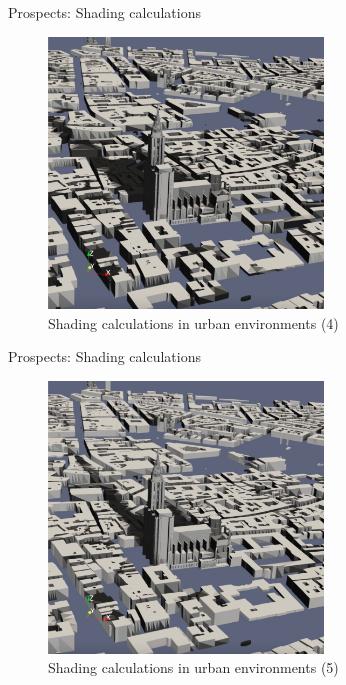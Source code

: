 \documentclass[10pt]{beamer}
\begin{document}
\begin{frame}{Prospects: Shading calculations}
  \begin{figure}
      \centering
      \includegraphics[width=0.65\textwidth]{images/shading-4.png}
      \caption{Shading calculations in urban environments (4)}
  \end{figure}
\end{frame}

\begin{frame}{Prospects: Shading calculations}
  \begin{figure}
      \centering
      \includegraphics[width=0.65\textwidth]{images/shading-5.png}
      \caption{Shading calculations in urban environments (5)}
  \end{figure}
\end{frame}
\end{document}
